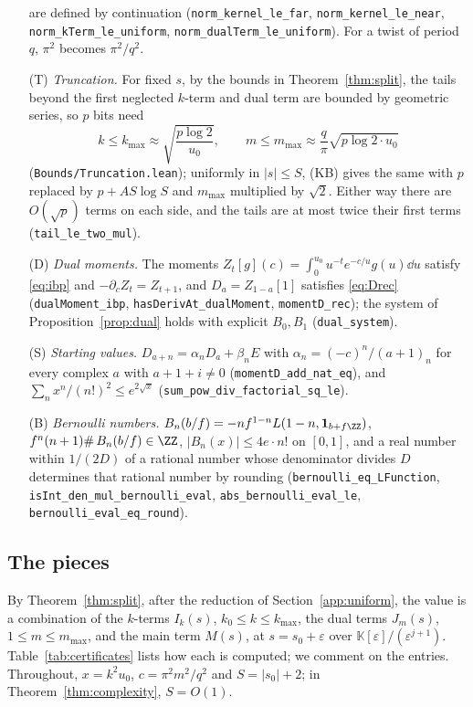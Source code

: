 \begin{small}
\begin{itemize}
are defined by continuation (\nolinkurl{norm_kernel_le_far}, \nolinkurl{norm_kernel_le_near},
\nolinkurl{norm_kTerm_le_uniform}, \nolinkurl{norm_dualTerm_le_uniform}). For a twist of period $q$, $\pi^2$ becomes
$\pi^2/q^2$.
\item[(T)] \emph{Truncation.} For fixed $s$, by the bounds in Theorem~\ref{thm:split}, the tails beyond the first
neglected $k$-term and dual term are bounded by geometric series, so $p$ bits need
\begin{equation}\label{eq:counts}
  k \le k_{\max} \approx \sqrt{\frac{p\log 2}{u_0}}, \qquad m \le m_{\max} \approx \frac{q}{\pi}\sqrt{p\log 2\cdot u_0}
\end{equation}
(\nolinkurl{Bounds/Truncation.lean}); uniformly in $|s| \le S$, (KB) gives the same with $p$ replaced by
$p + AS\log S$ and $m_{\max}$ multiplied by $\sqrt2$. Either way there are $O(\sqrt p)$ terms on each side, and the
tails are at most twice their first terms (\nolinkurl{tail_le_two_mul}).
\item[(D)] \emph{Dual moments.} The moments $Z_t[g](c) = \int_0^{u_0}u^{-t}e^{-c/u}g(u)\dd u$ satisfy
\eqref{eq:ibp} and $-\partial_cZ_t = Z_{t+1}$, and $D_a = Z_{1-a}[1]$ satisfies \eqref{eq:Drec}
(\nolinkurl{dualMoment_ibp}, \nolinkurl{hasDerivAt_dualMoment}, \nolinkurl{momentD_rec}); the system of
Proposition~\ref{prop:dual} holds with explicit $B_0, B_1$ (\nolinkurl{dual_system}).
\item[(S)] \emph{Starting values.} $D_{a+n} = \alpha_nD_a + \beta_nE$ with $\alpha_n = (-c)^n/(a+1)_n$ for every
complex $a$ with $a + 1 + i \ne 0$ (\nolinkurl{momentD_add_nat_eq}), and $\sum_nx^n/(n!)^2 \le e^{2\sqrt x}$
(\nolinkurl{sum_pow_div_factorial_sq_le}).
\item[(B)] \emph{Bernoulli numbers.} $B_n(b/f) = -nf^{1-n}L(1-n, \mathbf 1_{b+f\ZZ})$, $f^n(n+1)\#\,B_n(b/f) \in \ZZ$,
$|B_n(x)| \le 4e\cdot n!$ on $[0,1]$, and a real number within $1/(2D)$ of a rational number whose denominator divides
$D$ determines that rational number by rounding (\nolinkurl{bernoulli_eq_LFunction}, \nolinkurl{isInt_den_mul_bernoulli_eval},
\nolinkurl{abs_bernoulli_eval_le}, \nolinkurl{bernoulli_eval_eq_round}).
\end{itemize}

\subsection{The pieces}\label{app:pieces}
By Theorem~\ref{thm:split}, after the reduction of Section~\ref{app:uniform}, the value is a combination of the
$k$-terms $I_k(s)$, $k_0 \le k \le k_{\max}$, the dual terms $J_m(s)$, $1 \le m \le m_{\max}$, and the main term
$M(s)$, at $s = s_0 + \varepsilon$ over $\mathbb K[\varepsilon]/(\varepsilon^{j+1})$. Table~\ref{tab:certificates}
lists how each is computed; we comment on the entries. Throughout, $x = k^2u_0$, $c = \pi^2m^2/q^2$ and
$S = |s_0| + 2$; in Theorem~\ref{thm:complexity}, $S = O(1)$.


\end{small}
